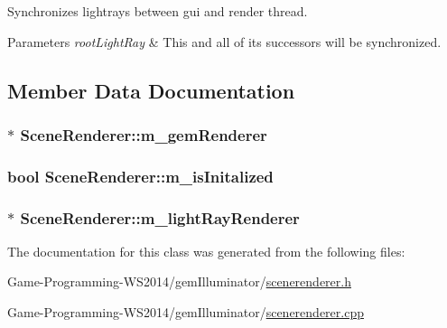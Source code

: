 Synchronizes lightrays between gui and render thread. 


\begin{DoxyParams}{Parameters}
{\em root\+Light\+Ray} & This and all of its successors will be synchronized. \\
\hline
\end{DoxyParams}


\subsection{Member Data Documentation}
\hypertarget{class_scene_renderer_adf73dd839ccd615bf377b8dba695255e}{}
\subsubsection[{m\+\_\+gem\+Renderer}]{$\ast$ Scene\+Renderer\+::m\+\_\+gem\+Renderer\hspace{0.3cm}{\ttfamily [protected]}}\label{class_scene_renderer_adf73dd839ccd615bf377b8dba695255e}
\hypertarget{class_scene_renderer_acaa9426d0e8b0c913709cbd40f5f7a32}{}
\subsubsection[{m\+\_\+is\+Initalized}]{\setlength{\rightskip}{0pt plus 5cm}bool Scene\+Renderer\+::m\+\_\+is\+Initalized\hspace{0.3cm}{\ttfamily [protected]}}\label{class_scene_renderer_acaa9426d0e8b0c913709cbd40f5f7a32}
\hypertarget{class_scene_renderer_a26d9a971a57c68a46653046343f91af6}{}
\subsubsection[{m\+\_\+light\+Ray\+Renderer}]{$\ast$ Scene\+Renderer\+::m\+\_\+light\+Ray\+Renderer\hspace{0.3cm}{\ttfamily [protected]}}\label{class_scene_renderer_a26d9a971a57c68a46653046343f91af6}


The documentation for this class was generated from the following files\+:\begin{DoxyCompactItemize}
\item 
Game-\/\+Programming-\/\+W\+S2014/gem\+Illuminator/\hyperlink{scenerenderer_8h}{scenerenderer.\+h}\item 
Game-\/\+Programming-\/\+W\+S2014/gem\+Illuminator/\hyperlink{scenerenderer_8cpp}{scenerenderer.\+cpp}\end{DoxyCompactItemize}
